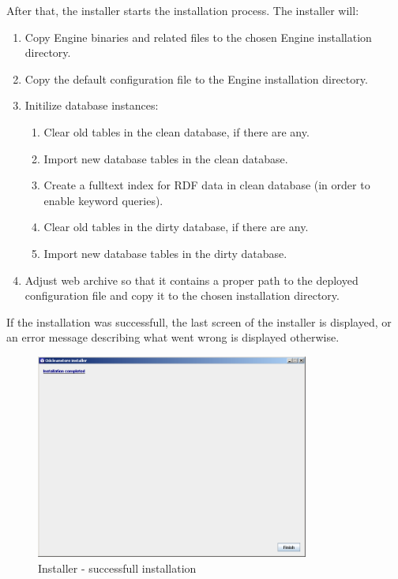 After that, the installer starts the installation process. The installer will:
\begin{enumerate}
    \item Copy Engine binaries and related files to the chosen Engine installation directory.
    \item Copy the default configuration file to the Engine installation directory.
    \item Initilize database instances:
        \begin{enumerate}
            \item Clear old tables in the clean database, if there are any.
            \item Import new database tables in the clean database.
            \item Create a fulltext index for RDF data in clean database (in order to enable keyword queries).
            \item Clear old tables in the dirty database, if there are any.
            \item Import new database tables in the dirty database.
        \end{enumerate}
    \item Adjust \FE web archive so that it contains a proper path to the deployed configuration file and copy it to the chosen \FE installation directory.
\end{enumerate}

If the installation was successfull, the last screen of the installer is displayed, or an error message describing what went wrong is displayed otherwise.

\begin{figure}[!h]
    \centering
    \includegraphics[width=0.8\textwidth]{images/install-step-last.png}
    \caption{Installer - successfull installation}
\end{figure}

